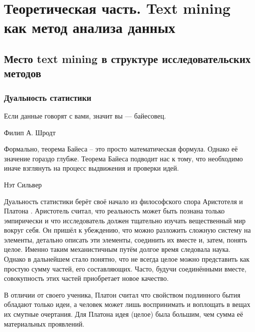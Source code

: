 \chapter{Теоретическая часть. Text mining как метод анализа данных} \label{chapt1}

\section{Место text mining в структуре исследовательских методов} \label{sect1_1}

\subsection{Дуальность статистики}

\epigraph{Если данные говорят с вами, значит вы --- байесовец.}{Филип А. Шродт \cite[стр. 11]{Schrodt2010}}

\epigraph{Формально, теорема Байеса -- это просто математическая формула. Однако её значение гораздо глубже. Теорема Байеса подводит нас к тому, что необходимо иначе взглянуть на процесс выдвижения и проверки идей.}{Нэт Сильвер\footnotemark\cite{silver2012}}



Дуальность статистики берёт своё начало из философского спора Аристотеля и Платона \cite[стр. 7]{handbook_stat_dm}. Аристотель считал, что реальность может быть познана только эмпирически и что исследователь должен тщательно изучать вещественный мир вокруг себя. Он пришёл к убеждению, что можно разложить сложную систему на элементы, детально описать эти элементы, соединить их вместе и, затем, понять целое. Именно таким механистичным путём долгое время следовала наука. Однако в дальнейшем стало понятно, что не всегда целое можно представить как простую сумму частей, его составляющих. Часто, будучи соединёнными вместе, совокупность этих частей приобретает новое качество.

В отличии от своего ученика, Платон считал что свойством подлинного бытия обладают только идеи, а человек может лишь воспринимать и воплощать в вещах их смутные очертания. Для Платона идея (целое) была большим, чем сумма её материальных проявлений.

